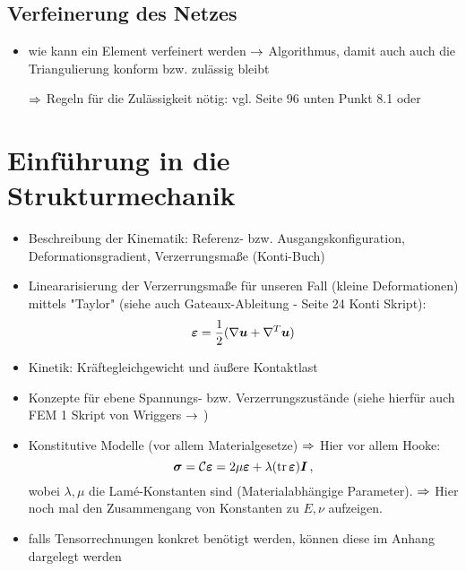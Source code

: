 \subsection{Verfeinerung des Netzes}
\label{kap:2.4.2}

\begin{itemize}
\item wie kann ein Element verfeinert werden $\rightarrow$ Algorithmus, damit auch auch die Triangulierung konform bzw. zulässig bleibt

\item[$\Rightarrow$] Regeln für die Zulässigkeit nötig: vgl. \cite{BraeFEM} Seite 96 unten Punkt 8.1 oder \cite{StarkePDE}
\end{itemize}






\section{Einführung in die Strukturmechanik}
\label{kap:2.5}

\begin{itemize}
\item Beschreibung der Kinematik: Referenz- bzw. Ausgangskonfiguration, Deformationsgradient, Verzerrungsmaße (Konti-Buch)
\item Lineararisierung der Verzerrungsmaße für unseren Fall (kleine Deformationen) mittels "Taylor" (siehe auch Gateaux-Ableitung - Seite 24 Konti Skript):
\[
	\boldsymbol {\varepsilon} = \frac 1 2 (\nabla \boldsymbol u + \nabla^T \boldsymbol u)
\]
\item Kinetik: Kräftegleichgewicht und äußere Kontaktlast
\item Konzepte für ebene Spannungs- bzw. Verzerrungszustände (siehe hierfür auch FEM 1 Skript von Wriggers $\rightarrow$ \cite{WriggersFEMSkript})
\item Konstitutive Modelle (vor allem Materialgesetze) $\Rightarrow$ Hier vor allem Hooke:
\[
	\boldsymbol \sigma = \mathcal C \boldsymbol {\varepsilon} = 2 \mu \boldsymbol {\varepsilon} + \lambda (\operatorname{tr} \boldsymbol {\varepsilon}) \boldsymbol I \, ,
\]
wobei $\lambda,\mu$ die Lamé-Konstanten sind (Materialabhängige Parameter). $\Rightarrow$ Hier noch mal den Zusammengang von Konstanten zu $E,\nu$ aufzeigen.
\item falls Tensorrechnungen konkret benötigt werden, können diese im Anhang dargelegt werden
\end{itemize}


\newpage

